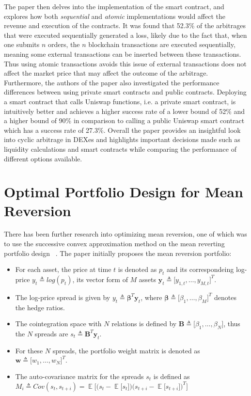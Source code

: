 \noindent The paper then delves into the implementation of the smart contract, and explores how both \textit{sequential} and \textit{atomic} implementations would affect the revenue and execution of the contracts. It was found that 52.3\% of the arbitrages that were executed sequentially generated a loss, likely due to the fact that, when one submits $n$ orders, the $n$ blockchain transactions are executed sequentially, meaning some external transactions can be inserted between these transactions. Thus using atomic transactions avoids this issue of external transactions does not affect the market price that may affect the outcome of the arbitrage.
\\[3mm]
Furthermore, the authors of the paper also investigated the performance differences between using private smart contracts and public contracts. Deploying a smart contract that calls Uniswap functions, i.e. a private smart contract, is intuitively better and achieves a higher success rate of a lower bound of 52\% and a higher bound of 90\% in comparison to calling a public Uniswap smart contract which has a success rate of 27.3\%. Overall the paper provides an insightful look into cyclic arbitrage in DEXes and highlights important decisions made such as liquidity calculations and smart contracts while comparing the performance of different options available.

\section{Optimal Portfolio Design for Mean Reversion}
\label{appendix:add-background-opt-portfolio-des-mean-revers}
There has been further research into optimizing mean reversion, one of which was to use the successive convex approximation method on the mean reverting portfolio design ~\cite{ZipingZhao2019OMPW}. The paper initially proposes the mean reversion portfolio:
\begin{itemize}
    \itemsep0em
    \item For each asset, the price at time $t$ is denoted as $p_t$ and its correspondeing log-price $y_t \triangleq log(p_t)$, its vector form of $M$ assets $\mathbf{y}_t \triangleq \big[ y_{1,t}, \dots ,y_{M,t} \big]^T$.
    \item The log-price spread is given by $y_t \triangleq \mathbf{\beta}^T\mathbf{y}_t$, where $\mathbf{\beta} \triangleq \big[ \beta_1, \dots ,\beta_M \big]^T$ denotes the hedge ratios.
    \item The cointegration space with $N$ relations is defined by $\mathbf{B} \triangleq \big[ \beta_1, \dots ,\beta_N \big]$, thus the $N$ spreads are $s_t \triangleq \mathbf{B}^T\mathbf{y}_t$.
    \item For these $N$ spreads, the portfolio weight matrix is denoted as $\mathbf{w} \triangleq \big[ w_1, \dots ,w_N \big]^T$.
    \item The auto-covariance matrix for the spreads $s_t$ is defined as \\ ${M_i \triangleq Cov(s_t, s_{t+i}) = \mathop{\mathbb{E}} \big[ \big( s_t - \mathop{\mathbb{E}} \big[ s_t \big]\big) \big( s_{t+i} - \mathop{\mathbb{E}} \big[ s_{t+i} \big]\big)^T \big]}$
\end{itemize}

